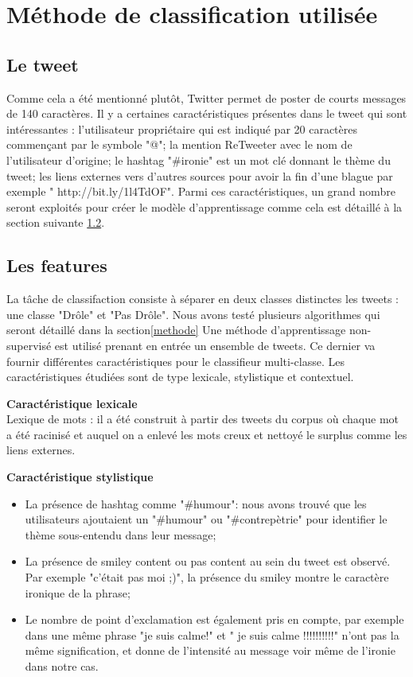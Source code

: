 \documentclass[10pt,a4paper,twoside]{article}
\begin{document}
\section{Méthode de classification utilisée}

\subsection{Le tweet} 
Comme cela a été mentionné plutôt, Twitter permet de poster de courts messages de 140 caractères. Il y a certaines caractéristiques présentes dans le tweet qui sont intéressantes : l'utilisateur propriétaire qui est indiqué par 20 caractères commençant par le symbole "@"; la mention ReTweeter avec le nom de l'utilisateur d'origine; le hashtag "\#ironie" est un mot clé donnant le thème du tweet; les liens externes vers d'autres sources pour avoir la fin d'une blague par exemple " http://bit.ly/1l4TdOF". Parmi ces caractéristiques, un grand nombre seront exploités pour créer le modèle d'apprentissage comme cela est détaillé à la section suivante \ref{features}.




\subsection{Les features}
\label{features}
La tâche de classifaction consiste à séparer en deux classes distinctes les tweets : une classe "Drôle" et "Pas Drôle". Nous avons testé plusieurs algorithmes qui seront détaillé dans la section\ref{methode}
Une méthode d'apprentissage non-supervisé est utilisé prenant en entrée un ensemble de tweets. Ce dernier va fournir différentes caractéristiques pour le classifieur multi-classe. Les caractéristiques étudiées sont de type lexicale, stylistique et contextuel. 

\textbf{Caractéristique lexicale}\\
Lexique de mots : il a été construit à partir des tweets du corpus où chaque mot a été racinisé et auquel on a enlevé les mots creux et nettoyé le surplus comme les liens externes.
\vspace{0.5cm}

\textbf{Caractéristique stylistique}
\begin{itemize}
\item La présence de hashtag comme "\#humour": nous avons trouvé que les utilisateurs ajoutaient un "\#humour" ou "\#contrepètrie" pour identifier le thème sous-entendu dans leur message;
\item La présence de smiley content ou pas content au sein du tweet est observé. Par exemple "c'était pas moi ;)", la présence du smiley montre le caractère ironique de la phrase;
\item Le nombre de point d'exclamation est également pris en compte, par exemple dans une même phrase "je suis calme!" et " je suis calme !!!!!!!!!!" n'ont pas la même signification, et donne de l'intensité au message voir même de l'ironie dans notre cas. 
\end{itemize}
\vspace{0.5cm}
\end{document}
